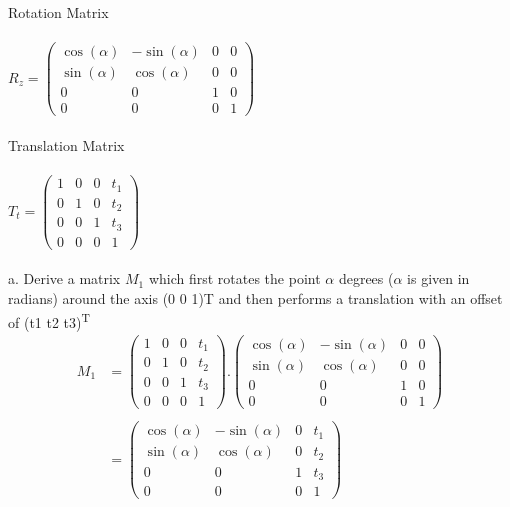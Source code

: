 \documentclass[10pt,a4paper]{article}
\begin{document}
Rotation Matrix \\ \\
\(
R_z=
  \begin{pmatrix}
    \cos(\alpha) & -\sin(\alpha) & 0 & 0 \\
    \sin(\alpha) & \cos(\alpha) & 0 & 0\\
    0 & 0 & 1 & 0 \\
    0 & 0 & 0 & 1
  \end{pmatrix}
\) \\ \\

Translation Matrix \\ \\
\(
T_t=
  \begin{pmatrix}
    1 & 0 & 0 & t_1 \\
    0 & 1 & 0 & t_2\\
    0 & 0 & 1 & t_3 \\
    0 & 0 & 0 & 1
  \end{pmatrix}
\) \\ \\

a. Derive a matrix $M_1$ which first rotates the point $\alpha$ degrees ($\alpha$ is given in radians) around the axis (0 0 1)T and then performs a translation with an offset of (t1 t2 t3)\textsuperscript{T} \\

\begin{equation*} \label{eq_M1}
\begin{aligned}
M_1 &= 
    \begin{pmatrix}
    1 & 0 & 0 & t_1 \\
    0 & 1 & 0 & t_2\\
    0 & 0 & 1 & t_3 \\
    0 & 0 & 0 & 1
  \end{pmatrix} . 
  \begin{pmatrix}
    \cos(\alpha) & -\sin(\alpha) & 0 & 0 \\
    \sin(\alpha) & \cos(\alpha) & 0 & 0\\
    0 & 0 & 1 & 0 \\
    0 & 0 & 0 & 1
  \end{pmatrix} \\ \\
  &= 
  \begin{pmatrix}
    \cos(\alpha) & -\sin(\alpha) & 0 & t_1 \\
    \sin(\alpha) & \cos(\alpha) & 0 & t_2\\
    0 & 0 & 1 & t_3 \\
    0 & 0 & 0 & 1
  \end{pmatrix}
\end{aligned}
\end{equation*} \\ \\
\end{document}
